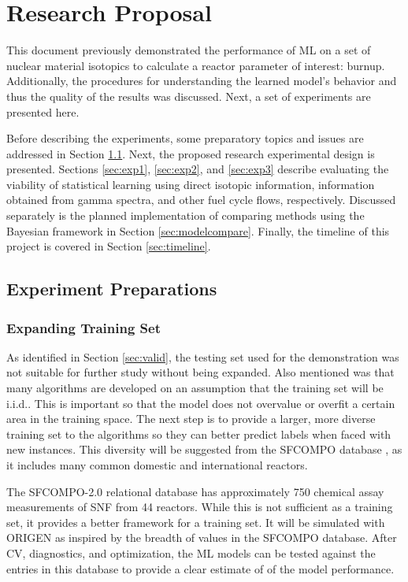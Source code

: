 \chapter{Research Proposal}
\label{ch:proposal}

This document previously demonstrated the performance of \gls{ML} on a
set of nuclear material isotopics to calculate a reactor parameter of interest:
burnup.  Additionally, the procedures for understanding the learned model's
behavior and thus the quality of the results was discussed.  Next, a set of
experiments are presented here. 

Before describing the experiments, some preparatory topics and issues are
addressed in Section \ref{sec:prep}.  Next, the proposed research experimental
design is presented. Sections \ref{sec:exp1}, \ref{sec:exp2}, and
\ref{sec:exp3} describe evaluating the viability of statistical learning using
direct isotopic information, information obtained from gamma spectra, and other
fuel cycle flows, respectively.  Discussed separately is the planned
implementation of comparing methods using the Bayesian framework in Section
\ref{sec:modelcompare}. Finally, the timeline of this project is covered in
Section \ref{sec:timeline}.

\section{Experiment Preparations}
\label{sec:prep}

\subsection*{Expanding Training Set}

As identified in Section \ref{sec:valid}, the testing set used for the
demonstration was not suitable for further study without being expanded. Also
mentioned was that many algorithms are developed on an assumption that the
training set will be \acrfull{i.i.d.}.  This is important so that the model
does not overvalue or overfit a certain area in the training space.  The next
step is to provide a larger, more diverse training set to the algorithms so
they can better predict labels when faced with new instances. This diversity
will be suggested from the \gls{SFCOMPO} database \cite{sfcompo}, as it
includes many common domestic and international reactors.

The SFCOMPO-2.0 relational database \cite{sfcompo} has approximately 750
chemical assay measurements of \gls{SNF} from 44 reactors. While this is not
sufficient as a training set, it provides a better framework for a training
set. It will be simulated with \gls{ORIGEN} as inspired by the breadth of
values in the \gls{SFCOMPO} database. After \gls{CV}, diagnostics, and
optimization, the \gls{ML} models can be tested against the entries in this
database to provide a clear estimate of of the model performance. 

